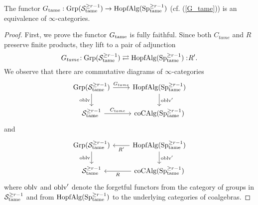 \begin{theorem}
	The functor $G_{\operatorname{\operatorname{tame}}}: \operatorname{Grp}({\mathcal{S}}^{\geq r-1}_{\operatorname{\operatorname{tame}}})\to \operatorname{HopfAlg}(\operatorname{Sp}^{\geq r-1}_{\operatorname{\operatorname{tame}}})$ (cf. (\ref{G_tame})) is an equivalence of $\infty$-categories.
\end{theorem}
\begin{proof}
First, we prove the functor $G_{\operatorname{\operatorname{tame}}}$ is fully faithful.
Since both $C_{tame}$ and $R$ preserve finite products, they lift to a pair of adjunction
\begin{equation}
\label{adj on grps}
	G_{tame}\negmedspace: \operatorname{Grp}({\mathcal{S}}^{\geq r-1}_{\operatorname{\operatorname{tame}}})\rightleftarrows \operatorname{HopfAlg}(\operatorname{Sp}^{\geq r-1}_{\operatorname{\operatorname{tame}}}):\negmedspace R'.
\end{equation}
We observe that there are commutative diagrams of $\infty$-categories
\[
\begin{tikzcd}
	\Grp(\CS^{\geq r-1}_{\tame}) & \Hopfalgebra(\Sp^{\geq r-1}_{\tame})\\
	\CS^{\geq r-1}_{\tame}  & 
	\coCAlg(\Sp^{\geq r-1}_{\tame})
	\arrow[from=1-1, to= 1-2, "G_{tame}"]
	\arrow[from=1-1, to=2-1, "\oblv" left]
	\arrow[from=1-2, to=2-2, "\oblv'" ]
	\arrow[from=2-1, to= 2-2, "C_{tame}"]
\end{tikzcd}
\]
and 
\[
\begin{tikzcd}
	\Grp(\CS^{\geq r-1}_{\tame}) & \Hopfalgebra(\Sp^{\geq r-1}_{\tame})\\
	\CS^{\geq r-1}_{\tame}  & 
	\coCAlg(\Sp^{\geq r-1}_{\tame})
	\arrow[from=1-2, to= 1-1, "R'"]
	\arrow[from=1-1, to=2-1, "\oblv" left]
	\arrow[from=1-2, to=2-2, "\oblv'" ]
	\arrow[from=2-2, to= 2-1, "R"]
\end{tikzcd}
\]
where $\operatorname{oblv}$ and $\operatorname{oblv}'$ denote the forgetful functors from the category of groups in ${\mathcal{S}}^{\geq r-1}_{\operatorname{\operatorname{tame}}}$ and from $\operatorname{HopfAlg}(\operatorname{Sp}^{\geq r-1}_{\operatorname{\operatorname{tame}}})$ to the underlying categories of coalgebras.


\end{proof}
